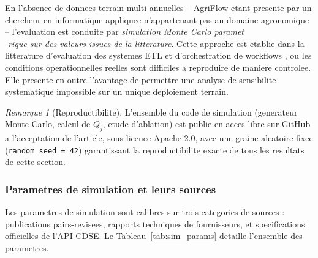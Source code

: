 \documentclass[12pt,a4paper]{article}
\theoremstyle{plain}
\theoremstyle{definition}
\theoremstyle{remark}
\newtheorem{remark}[theorem]{Remarque}
\begin{document}
	En l'absence de donnees terrain multi-annuelles -- AgriFlow etant
	presente par un chercheur en informatique appliquee n'appartenant
	pas au domaine agronomique -- l'evaluation est conduite par
	\emph{simulation Monte Carlo paramet\\-rique sur des valeurs issues de
		la litterature}. Cette approche est etablie dans la litterature
	d'evaluation des systemes ETL et d'orchestration de workflows
	\cite{pipeline_survey_2024,montecarlo_etl_eval,sim_workflow_eval}, ou les conditions operationnelles
	reelles sont difficiles a reproduire de maniere controlee.
	Elle presente en outre l'avantage de permettre une analyse de
	sensibilite systematique impossible sur un unique deploiement terrain.
	
	\begin{remark}[Reproductibilite]
		L'ensemble du code de simulation (generateur Monte Carlo, calcul
		de $Q_j$, etude d'ablation) est publie en acces libre sur GitHub
		a l'acceptation de l'article, sous licence Apache 2.0, avec une
		graine aleatoire fixee (\texttt{random\_seed = 42}) garantissant
		la reproductibilite exacte de tous les resultats de cette section.
	\end{remark}
	
	\subsubsection{Parametres de simulation et leurs sources}
	
	Les parametres de simulation sont calibres sur trois categories
	de sources : publications pairs-revisees, rapports techniques de
	fournisseurs, et specifications officielles de l'API CDSE.
	Le Tableau~\ref{tab:sim_params} detaille l'ensemble des parametres.
	
\end{document}
